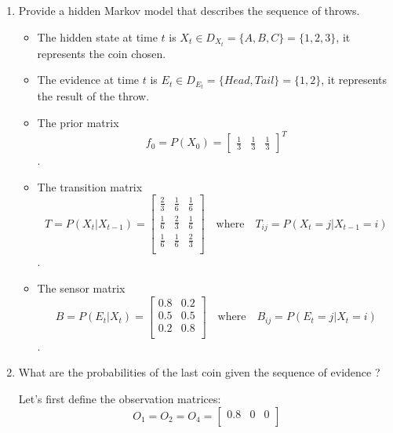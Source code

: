 \documentclass[9pt,a4paper]{extarticle}
\newenvironment{solution}
    {%
    \color{red}
    }
    { 
    \color{black}
    }
\begin{document}
   \begin{enumerate}
       \item Provide a hidden Markov model that describes the sequence of throws.
              \begin{solution}
       \begin{itemize}
           \item The hidden state at time $t$ is $X_t \in D_{X_t} = \{A, B, C\} = \{1, 2, 3\} $, it represents the coin chosen.
           \item The evidence at time $t$ is $E_t \in D_{E_t} = \{Head, Tail\} = \{1, 2\}$, it represents the result of the throw.
           \item The prior matrix 
            $$
           f_0 = P(X_0) = 
           \begin{bmatrix}
           \frac{1}{3} & \frac{1}{3} & \frac{1}{3}
           \end{bmatrix}^T
           $$.
           \item The transition matrix 
           $$
           T = P(X_t|X_{t-1}) = 
           \begin{bmatrix}
           \frac{2}{3} & \frac{1}{6} & \frac{1}{6}\\
           \frac{1}{6} & \frac{2}{3} & \frac{1}{6}\\
           \frac{1}{6} & \frac{1}{6} & \frac{2}{3}\\
           \end{bmatrix} \quad \text{where} \quad T_{ij} = P(X_t=j|X_{t-1}=i)
           $$.
           \item The sensor matrix 
           $$
           B = P(E_t|X_t) = 
           \begin{bmatrix}
           0.8 & 0.2\\
           0.5 & 0.5\\
           0.2 & 0.8\\
           \end{bmatrix}
           \quad \text{where} \quad B_{ij} = P(E_t=j|X_{t}=i)
           $$.
       \end{itemize}
       \end{solution}
       \item What are the probabilities of the last coin given the sequence of evidence ?
       \begin{solution}
       Let's first define the observation matrices:
       $$ O_1 = O_2 = O_4 = 
       \begin{bmatrix}
       0.8 & 0 & 0\\

\end{bmatrix}$$
\end{solution}
\end{enumerate}
\end{document}
